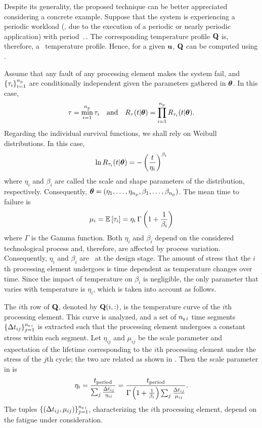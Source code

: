 Despite its generality, the proposed technique can be better appreciated considering a concrete example.
Suppose that the system is experiencing a periodic workload (\eg, due to the execution of a periodic or nearly periodic application) with period $\period$.
The corresponding temperature profile $\mQ$ is, therefore, a \dss\ temperature profile.
Hence, for a given $\vu$, $\mQ$ can be computed using .

Assume that any fault of any processing element makes the system fail, and $\{ \T_i \}_{i = 1}^\nprocs$ are conditionally independent given the parameters gathered in $\pvw$.
In this case,
\[
  \T = \min_{i = 1}^\nprocs \T_i \hspace{1em} \text{and} \hspace{1em} \survival_\T(\t | \pvw) = \prod_{i = 1}^\nprocs \survival_{\T_i}(\t | \pvw).
\]
Regarding the individual survival functions, we shall rely on Weibull distributions.
In this case,
\begin{equation} \elab{weibull-model}
  \ln \survival_{\T_i}(\t | \pvw) = -\left( \frac{\t}{\eta_i} \right)^{\beta_i}
\end{equation}
where $\eta_i$ and $\beta_i$ are called the scale and shape parameters of the distribution, respectively.
Consequently, $\pvw = (\eta_1, \dotsc, \eta_\nprocs, \beta_1, \dotsc, \beta_\nprocs)$.
The mean time to failure is
\begin{equation} \elab{weibull-expectation}
  \mu_i = \expectation{\T_i} = \eta_i \, \Gamma\left(1 + \frac{1}{\beta_i}\right)
\end{equation}
where $\Gamma$ is the Gamma function.
Both $\eta_i$ and $\beta_i$ depend on the considered technological process and, therefore, are affected by process variation.
Consequently, $\eta_i$ and $\beta_i$ are \rvs\ at the design stage.
The amount of stress that the $i$th processing element undergoes is time dependent as temperature changes over time.
Since the impact of temperature on $\beta_i$ is negligible, the only parameter that varies with temperature is $\eta_i$, which is taken into account as follows.

The $i$th row of $\mQ$, denoted by $\mQ(i, :)$, is the temperature curve of the $i$th processing element.
This curve is analyzed, and a set of $\nsegments[i]$ time segments $\{ \dt_{ij} \}_{j = 1}^{\nsegments[i]}$ is extracted such that the processing element undergoes a constant stress within each segment.
Let $\eta_{ij}$ and $\mu_{ij}$ be the scale parameter and expectation of the lifetime corresponding to the $i$th processing element under the stress of the $j$th cycle; the two are related as shown in .
Then the scale parameter in  is \cite{xiang2010}
\begin{equation} \elab{compound-weibull-eta}
  \eta_i = \frac{\period}{\sum_j\frac{\dt_{ij}}{\eta_{ij}}} = \frac{\period}{\Gamma\left(1 + \frac{1}{\beta_i}\right) \sum_j\frac{\dt_{ij}}{\mu_{ij}}}.
\end{equation}
The tuples $\{ (\dt_{ij}, \mu_{ij}) \}_{j = 1}^{\nsegments[i]}$, characterizing the $i$th processing element, depend on the fatigue under consideration.

